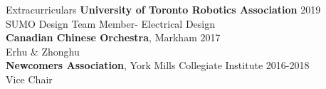 \documentclass{my_resume} %
\begin{document}
\begin{minipage}[t]{0.66\textwidth}
    \begin{rSection}{Extracurriculars}
        {\bf University of Toronto Robotics Association} \hfill{2019}    \\        
        SUMO Design Team Member- Electrical Design\\
        {\bf Canadian Chinese Orchestra}, Markham  \hfill{2017}\\ 
        Erhu \& Zhonghu \\
        {\bf Newcomers Association}, York Mills Collegiate Institute \hfill{2016-2018}\\
        Vice Chair
    \end{rSection}


\end{minipage}
\end{document}
